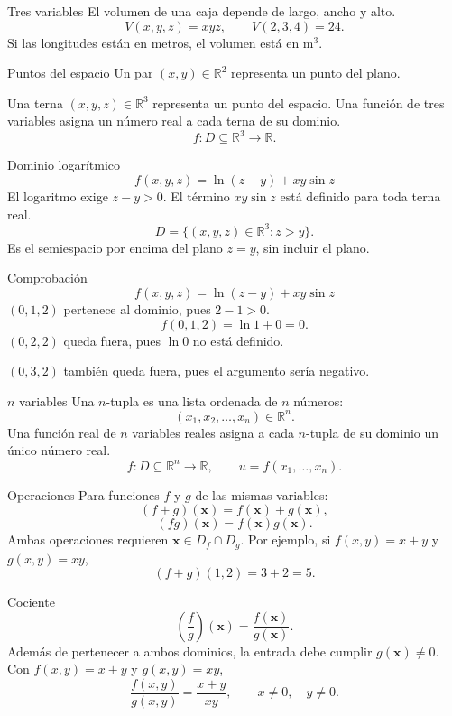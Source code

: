 \begin{frame}{Tres variables}
El volumen de una caja depende de largo, ancho y alto.
\[V(x,y,z)=xyz,\qquad V(2,3,4)=24.\]
Si las longitudes están en metros, el volumen está en $\mathrm{m}^3$.
\end{frame}
\begin{frame}{Puntos del espacio}
Un par $(x,y)\in\mathbb R^2$ representa un punto del plano.

Una terna $(x,y,z)\in\mathbb R^3$ representa un punto del espacio.
\medskip
Una función de tres variables asigna un número real a cada terna de su dominio.
\[f:D\subseteq\mathbb R^3\longrightarrow\mathbb R.\]
\end{frame}
\begin{frame}{Dominio logarítmico}
\[f(x,y,z)=\ln(z-y)+xy\sin z\]
El logaritmo exige $z-y>0$. El término $xy\sin z$ está definido para toda terna real.
\[D=\{(x,y,z)\in\mathbb R^3:z>y\}.\]
Es el semiespacio por encima del plano $z=y$, sin incluir el plano.
\end{frame}
\begin{frame}{Comprobación}
\[f(x,y,z)=\ln(z-y)+xy\sin z\]
$(0,1,2)$ pertenece al dominio, pues $2-1>0$.
\[f(0,1,2)=\ln1+0=0.\]
$(0,2,2)$ queda fuera, pues $\ln0$ no está definido.

$(0,3,2)$ también queda fuera, pues el argumento sería negativo.
\end{frame}
\begin{frame}{$n$ variables}
Una $n$-tupla es una lista ordenada de $n$ números:
\[(x_1,x_2,\ldots,x_n)\in\mathbb R^n.\]
Una función real de $n$ variables reales asigna a cada $n$-tupla de su dominio un único número real.
\[f:D\subseteq\mathbb R^n\longrightarrow\mathbb R,\qquad u=f(x_1,\ldots,x_n).\]
\end{frame}
\begin{frame}{Operaciones}
Para funciones $f$ y $g$ de las mismas variables:
\[(f+g)(\mathbf x)=f(\mathbf x)+g(\mathbf x),\]
\[(fg)(\mathbf x)=f(\mathbf x)g(\mathbf x).\]
Ambas operaciones requieren $\mathbf x\in D_f\cap D_g$.
\medskip
Por ejemplo, si $f(x,y)=x+y$ y $g(x,y)=xy$,
\[(f+g)(1,2)=3+2=5.\]
\end{frame}
\begin{frame}{Cociente}
\[\left(\frac fg\right)(\mathbf x)=\frac{f(\mathbf x)}{g(\mathbf x)}.\]
Además de pertenecer a ambos dominios, la entrada debe cumplir $g(\mathbf x)\ne0$.
\medskip
Con $f(x,y)=x+y$ y $g(x,y)=xy$,
\[\frac{f(x,y)}{g(x,y)}=\frac{x+y}{xy},\qquad x\ne0,\quad y\ne0.\]
\end{frame}
